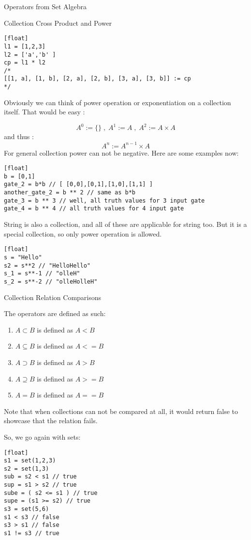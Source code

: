 \begin{section}{Operators from Set Algebra}
\begin{subsection}{Collection Cross Product and Power}
\begin{lstlisting}[style=JexlStyle][float]
l1 = [1,2,3]
l2 = ['a','b' ]
cp = l1 * l2 
/*
[[1, a], [1, b], [2, a], [2, b], [3, a], [3, b]] := cp 
*/
\end{lstlisting}
Obviously we can think of power operation or exponentiation 
on a collection itself. That would be easy :

$$
A^0 := \{\} \; , \; A^1 := A \; , \; A^2 := A \times A
$$
and thus :
$$
A^n :=  A^{n-1} \times A
$$
For general collection power can not be negative.
Here are some examples now:

\begin{lstlisting}[style=JexlStyle][float]
b = [0,1]
gate_2 = b*b // [ [0,0],[0,1],[1,0],[1,1] ]
another_gate_2 = b ** 2 // same as b*b 
gate_3 = b ** 3 // well, all truth values for 3 input gate 
gate_4 = b ** 4 // all truth values for 4 input gate 
\end{lstlisting}

String is also a collection, and all of these are applicable for string too.
But it is a special collection, so only power operation is allowed.

\begin{lstlisting}[style=JexlStyle][float]
s = "Hello"
s2 = s**2 // "HelloHello"
s_1 = s**-1 // "olleH"
s_2 = s**-2 // "olleHolleH"
\end{lstlisting}
\end{subsection}

\begin{subsection}{Collection Relation Comparisons}

The operators are defined as such:
\begin{enumerate}
\item{ $A \subset B $ is defined as $A < B $  }
\item{ $A \subseteq B $ is defined as $A <= B $  }
\item{ $A \supset B $ is defined as $A > B $  }
\item{ $A \supseteq B $ is defined as $A >= B $  }
\item{ $A = B$ is defined as $A == B$  }
\end{enumerate}

Note that when collections can not be compared at all, 
it would return false to showcase that the relation fails.

So, we go again with sets:

\begin{lstlisting}[style=JexlStyle][float]
s1 = set(1,2,3)
s2 = set(1,3)
sub = s2 < s1 // true  
sup = s1 > s2 // true 
sube = ( s2 <= s1 ) // true  
supe = (s1 >= s2) // true 
s3 = set(5,6)
s1 < s3 // false 
s3 > s1 // false 
s1 != s3 // true
\end{lstlisting}


\end{subsection}
\end{section}
